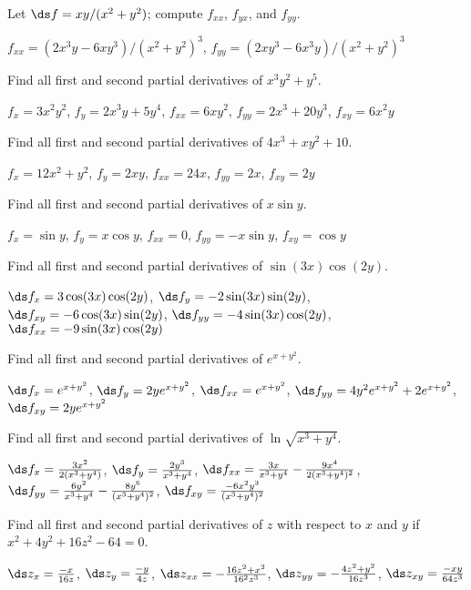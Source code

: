 \begin{exercises}

\exercise Let $\ds f=xy/(x^2+y^2)$; compute $f_{xx}$, $f_{yx}$, and $f_{yy}$.
\begin{answer} $f_{xx}=(2x^3y-6xy^3)/(x^2+y^2)^3$,
$f_{yy}=(2xy^3-6x^3y)/(x^2+y^2)^3$
\end{answer}

\exercise Find all first and second partial derivatives of
$x^3y^2+y^5$.
\begin{answer} $f_x=3x^2y^2$, $f_y=2x^3y+5y^4$, 
$f_{xx}=6xy^2$, $f_{yy}=2x^3+20y^3$, $f_{xy}=6x^2y$
\end{answer}

\exercise Find all first and second partial derivatives of
$4x^3+xy^2+10$.
\begin{answer} $f_x=12x^2+y^2$, $f_y=2xy$, \hfill\break 
$f_{xx}=24x$, $f_{yy}=2x$, $f_{xy}=2y$
\end{answer}

\exercise Find all first and second partial derivatives of
$x\sin y$.
\begin{answer} $f_x=\sin y$, $f_y=x\cos y$, $f_{xx}=0$, $f_{yy}=-x\sin y$,
$f_{xy}=\cos y$
\end{answer}

\exercise Find all first and second partial derivatives of
$\sin(3x)\cos(2y)$.
\begin{answer} $\ds f_x=3\cos(3x)\cos(2y)$,\hfill\break 
$\ds f_y=-2\sin(3x)\sin(2y)$,\hfill\break 
$\ds f_{xy}=-6\cos(3x)\sin(2y)$,\hfill\break 
$\ds f_{yy}=-4\sin(3x)\cos(2y)$,\hfill\break 
$\ds f_{xx}=-9\sin(3x)\cos(2y)$
\end{answer}

\exercise Find all first and second partial derivatives of
$e^{x+y^2}$.
\begin{answer} $\ds f_x=e^{x+y^2}$, $\ds f_y=2ye^{x+y^2}$,\hfill\break 
$\ds f_{xx}=e^{x+y^2}$,\hfill\break 
$\ds f_{yy}=4y^2e^{x+y^2}+2e^{x+y^2}$,\hfill\break 
$\ds f_{xy}=2ye^{x+y^2}$
\end{answer}

\exercise Find all first and second partial derivatives of
$\ln\sqrt{x^3+y^4}$.
\begin{answer} $\ds f_x={3x^2\over2(x^3+y^4)}$, 
$\ds f_y={2y^3\over x^3+y^4}$,
$\ds f_{xx}={3x\over x^3+y^4}-{9x^4\over 2(x^3+y^4)^2}$, 
$\ds f_{yy}={6y^2\over x^3+y^4}-{8y^6\over (x^3+y^4)^2}$,\hfill\break 
$\ds f_{xy}={-6x^2y^3\over (x^3+y^4)^2}$
\end{answer}

\exercise Find all first and second partial derivatives of
$z$ with respect to $x$ and $y$ if 
$x^2+4y^2+16z^2-64=0$.
\begin{answer} $\ds z_x={-x\over16z}$, 
$\ds z_y={-y\over4z}$,\hfill\break 
$\ds z_{xx}=-{16z^2+x^2\over16^2z^3}$,\hfill\break 
$\ds z_{yy}=-{4z^2+y^2\over16z^3}$,\hfill\break 
$\ds z_{xy}={-xy\over64z^3}$
\end{answer}


\end{exercises}
